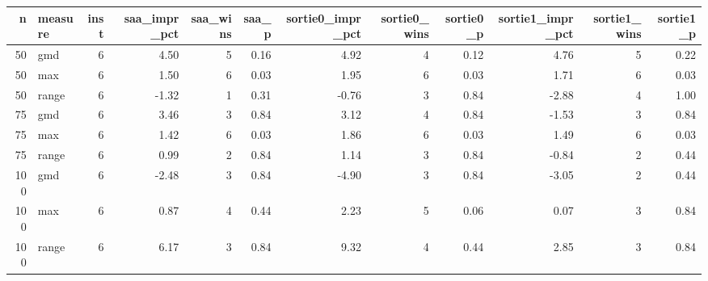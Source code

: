 \begin{tabular}{rlrrrrrrrrrr}
\toprule
n & measure & inst & saa_impr_pct & saa_wins & saa_p & sortie0_impr_pct & sortie0_wins & sortie0_p & sortie1_impr_pct & sortie1_wins & sortie1_p \\
\midrule
50 & gmd & 6 & 4.50 & 5 & 0.16 & 4.92 & 4 & 0.12 & 4.76 & 5 & 0.22 \\
50 & max & 6 & 1.50 & 6 & 0.03 & 1.95 & 6 & 0.03 & 1.71 & 6 & 0.03 \\
50 & range & 6 & -1.32 & 1 & 0.31 & -0.76 & 3 & 0.84 & -2.88 & 4 & 1.00 \\
75 & gmd & 6 & 3.46 & 3 & 0.84 & 3.12 & 4 & 0.84 & -1.53 & 3 & 0.84 \\
75 & max & 6 & 1.42 & 6 & 0.03 & 1.86 & 6 & 0.03 & 1.49 & 6 & 0.03 \\
75 & range & 6 & 0.99 & 2 & 0.84 & 1.14 & 3 & 0.84 & -0.84 & 2 & 0.44 \\
100 & gmd & 6 & -2.48 & 3 & 0.84 & -4.90 & 3 & 0.84 & -3.05 & 2 & 0.44 \\
100 & max & 6 & 0.87 & 4 & 0.44 & 2.23 & 5 & 0.06 & 0.07 & 3 & 0.84 \\
100 & range & 6 & 6.17 & 3 & 0.84 & 9.32 & 4 & 0.44 & 2.85 & 3 & 0.84 \\
\bottomrule
\end{tabular}
